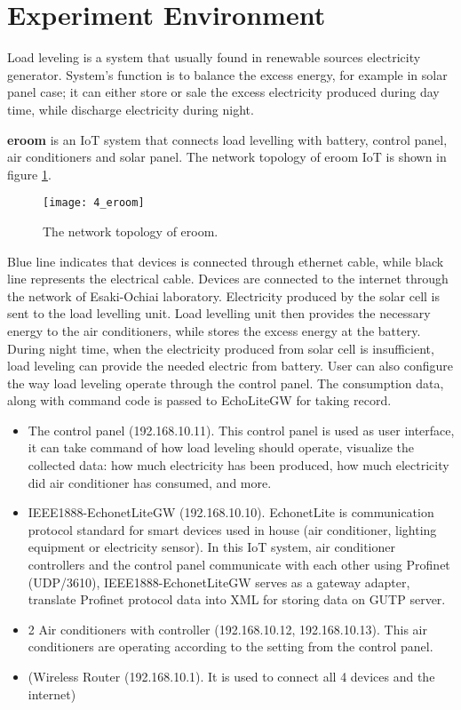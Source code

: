 \section{Experiment Environment} 
\label{s4:capture}

Load leveling is a system that usually found in renewable sources electricity generator. System’s function is to balance the excess energy, for example in solar panel case; it can either store or sale the excess electricity produced during day time, while discharge electricity during night.

\textbf{eroom} is an IoT system that connects load levelling with battery, control panel, air conditioners and solar panel. The network topology of eroom IoT is shown in figure \ref{fig:s4_eroom}. 

\begin{figure}[H]
    \centering  
    \texttt{[image: 4\_eroom]} 
    \caption{\small The network topology of eroom.} 
    \label{fig:s4_eroom} 
\end{figure}  

Blue line indicates that devices is connected through ethernet cable, while black line represents the electrical cable. 
Devices are connected to the internet through the network of Esaki-Ochiai laboratory. 
Electricity produced by the solar cell is sent to the load levelling unit. 
Load levelling unit then provides the necessary energy to the air conditioners,
while stores the excess energy at the battery. 
During night time, when the electricity produced from solar cell is insufficient, 
load leveling can provide the needed electric from battery. 
User can also configure the way load leveling operate through the control panel. 
The consumption data, along with command code is passed to EchoLiteGW for taking record. 

\begin{itemize}[itemsep=0mm] 
    \item The control panel (192.168.10.11). This control panel is used as user interface, it can take command of how load leveling should operate, visualize the collected data: how much electricity has been produced, how much electricity did air conditioner has consumed, and more. 
    \item IEEE1888-EchonetLiteGW (192.168.10.10). EchonetLite is communication protocol standard for smart devices used in house (air conditioner, lighting equipment or electricity sensor). In this IoT system, air conditioner controllers and the control panel communicate with each other using Profinet (UDP/3610), IEEE1888-EchonetLiteGW serves as a gateway adapter, translate Profinet protocol data into XML for storing data on GUTP server.  
    \item 2 Air conditioners with controller (192.168.10.12, 192.168.10.13). This air conditioners are operating according to the setting from the control panel. 
    \item (Wireless Router (192.168.10.1). It is used to connect all 4 devices and the internet) 
\end{itemize} 